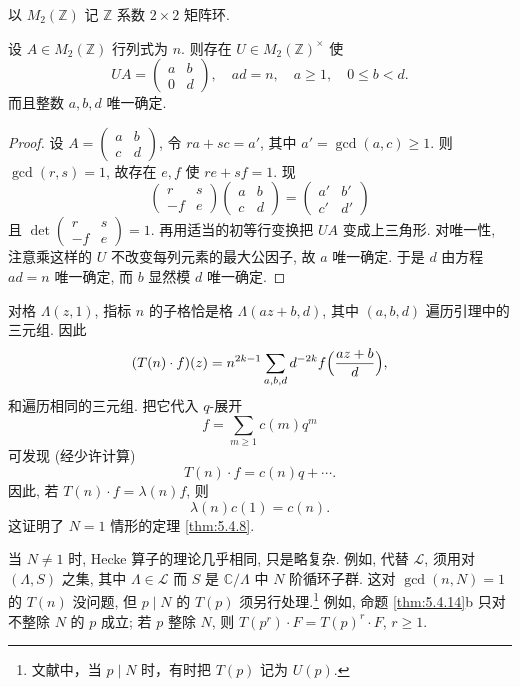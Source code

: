 以 $M_2(\mathbb{Z})$ 记 $\mathbb{Z}$ 系数 $2\times 2$ 矩阵环.

\begin{lemma} \label{thm:5.4.15}
设 $A\in M_2(\mathbb{Z})$ 行列式为 $n$. 则存在 $U\in M_2(\mathbb{Z})^{\times}$ 使
\[
UA = \begin{pmatrix}a & b\\ 0 & d\end{pmatrix}, \quad ad = n, \quad a\ge 1, \quad 0\le b < d.
\]
而且整数 $a, b, d$ 唯一确定.
\end{lemma}

\begin{proof}
设 $A = \begin{pmatrix}a & b\\ c & d\end{pmatrix}$, 令 $ra + sc = a'$, 其中 $a' = \gcd(a, c)\ge 1$. 则 $\gcd(r, s) = 1$, 故存在 $e, f$ 使 $re + sf = 1$. 现
\[
\begin{pmatrix}r & s\\ -f & e\end{pmatrix}\begin{pmatrix}a & b\\ c & d\end{pmatrix} = \begin{pmatrix}a' & b'\\ c' & d'\end{pmatrix}
\]
且 $\det\begin{pmatrix}r & s\\ -f & e\end{pmatrix} = 1$. 再用适当的初等行变换把 $UA$ 变成上三角形. 对唯一性, 注意乘这样的 $U$ 不改变每列元素的最大公因子, 故 $a$ 唯一确定. 于是 $d$ 由方程 $ad = n$ 唯一确定, 而 $b$ 显然模 $d$ 唯一确定.
\end{proof}

对格 $\Lambda(z, 1)$, 指标 $n$ 的子格恰是格 $\Lambda(az+b, d)$, 其中 $(a, b, d)$ 遍历引理中的三元组. 因此
\[
(T(n)\cdot f)(z) = n^{2k-1}\sum_{a, b, d}d^{-2k}f\Bigl(\frac{az+b}{d}\Bigr),
\]
和遍历相同的三元组. 把它代入 $q$-展开
\[
f = \sum_{m\ge 1}c(m)q^m
\]
可发现 (经少许计算)
\[
T(n)\cdot f = c(n)q + \cdots.
\]
因此, 若 $T(n)\cdot f = \lambda(n)f$, 则
\[
\lambda(n)c(1) = c(n).
\]
这证明了 $N = 1$ 情形的定理 \ref{thm:5.4.8}.

当 $N\neq 1$ 时, Hecke 算子的理论几乎相同, 只是略复杂. 例如, 代替 $\mathcal{L}$, 须用对 $(\Lambda, S)$ 之集, 其中 $\Lambda\in\mathcal{L}$ 而 $S$ 是 $\mathbb{C}/\Lambda$ 中 $N$ 阶循环子群. 这对 $\gcd(n, N) = 1$ 的 $T(n)$ 没问题, 但 $p\mid N$ 的 $T(p)$ 须另行处理.\footnote{文献中，当 $p\mid N$ 时，有时把 $T(p)$ 记为 $U(p)$.} 例如, 命题 \ref{thm:5.4.14}b 只对不整除 $N$ 的 $p$ 成立; 若 $p$ 整除 $N$, 则 $T(p^r)\cdot F = T(p)^r\cdot F$, $r\ge 1$.

